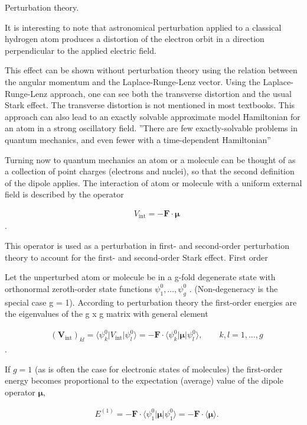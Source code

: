 \documentclass[main.tex]{subfiles}
\newcommand{\mblock}[1]{ {\allowbreak $#1$ }}
\begin{document}
Perturbation theory.

It is interesting to note that astronomical perturbation applied to a classical hydrogen atom produces a distortion of the electron orbit in a direction perpendicular to the applied electric field.

This effect can be shown without perturbation theory using the relation between the angular momentum and the Laplace-Runge-Lenz vector. Using the Laplace-Runge-Lenz approach, one can see both the transverse distortion and the usual Stark effect. The transverse distortion is not mentioned in most textbooks. This approach can also lead to an exactly solvable approximate model Hamiltonian for an atom in a strong oscillatory field. ''There are few exactly-solvable problems in quantum mechanics, and even fewer with a time-dependent Hamiltonian''

Turning now to quantum mechanics an atom or a molecule can be thought of as a collection of point charges (electrons and nuclei), so that the second definition of the dipole applies. The interaction of atom or molecule with a uniform external field is described by the operator

\begin{align*}
&    V_{\mathrm{int}} = - \mathbf{F}\cdot \boldsymbol{\mu}
\end{align*}.

This operator is used as a perturbation in first- and second-order perturbation theory to account for the first- and second-order Stark effect.
First order

Let the unperturbed atom or molecule be in a g-fold degenerate state with orthonormal zeroth-order state functions \mblock{\psi^0_1, \ldots, \psi^0_g} . (Non-degeneracy is the special case g = 1). According to perturbation theory the first-order energies are the eigenvalues of the g x g matrix with general element

\begin{align*}
&(\mathbf{V}_{\mathrm{int}})_{kl} = \langle \psi^0_k | V_{\mathrm{int}} | \psi^0_l \rangle = -\mathbf{F}\cdot \langle \psi^0_k | \boldsymbol{\mu} | \psi^0_l \rangle, \qquad k,l=1,\ldots, g
\end{align*}
. 

If $g = 1$ (as is often the case for electronic states of molecules) the first-order energy becomes proportional to the expectation (average) value of the dipole operator $\boldsymbol{\mu}$,

\begin{align*}
&E^{(1)} = -\mathbf{F}\cdot \langle \psi^0_1 | \boldsymbol{\mu} | \psi^0_1 \rangle = -\mathbf{F}\cdot \langle \boldsymbol{\mu} \rangle.
\end{align*}
\end{document}
